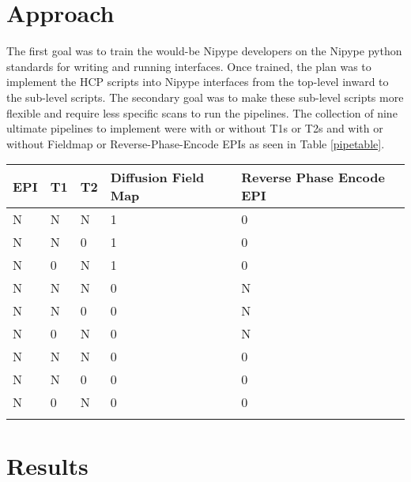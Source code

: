 \documentclass[twocolumn]{bmcart}%
\begin{document}
\section{Approach}\label{approach}

The first goal was to train the would-be Nipype developers on the Nipype
python standards for writing and running interfaces. Once trained, the
plan was to implement the HCP scripts into Nipype interfaces from the
top-level inward to the sub-level scripts. The secondary goal was to
make these sub-level scripts more flexible and require less specific
scans to run the pipelines. The collection of nine ultimate pipelines to
implement were with or without T1s or T2s and with or without Fieldmap
or Reverse-Phase-Encode EPIs as seen in Table \ref{pipetable}.

\begin{table*}[t!]
\caption{\label{pipetable}Nine pipelines to be implemented.}
\begin{tabular}{l l l l l}
 \hline\noalign{\smallskip}
  EPI & T1 & T2 & Diffusion Field Map & Reverse Phase Encode EPI \\
    \hline\noalign{\smallskip}
  N & N & N & 1 & 0 \\
  N & N & 0 & 1 & 0 \\
  N & 0 & N & 1 & 0 \\
  N & N & N & 0 & N \\
  N & N & 0 & 0 & N \\
  N & 0 & N & 0 & N \\
  N & N & N & 0 & 0 \\
  N & N & 0 & 0 & 0 \\
  N & 0 & N & 0 & 0 \\
  \noalign{\smallskip}\hline
\end{tabular}
\end{table*}

\section{Results}\label{results}
\end{document}
